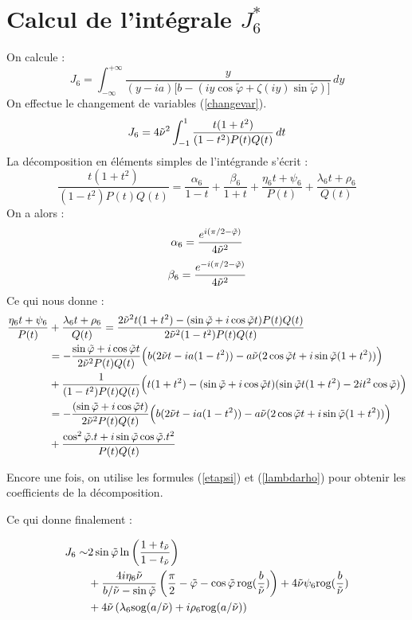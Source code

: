 \section{Calcul de l'intégrale $J_6^*$}
On calcule :
\begin{equation}
J_6=\int_{-\infty}^{+\infty} \frac{y}{(y-ia)\lbrack b-(iy\cos \tilde{\varphi}+ \zeta(iy)\sin \tilde{\varphi}) \rbrack}\,dy
\label{defJ6}
\end{equation}
On effectue le changement de variables (\ref{changevar}).
$$ J_6=4\tilde{\nu}^2\int_{-1}^{1}\frac{t(1+t^2)}{(1-t^2)P(t)Q(t)}\,dt $$
La décomposition en éléments simples de l'intégrande s'écrit :
$$\frac{t(1+t^2)}{(1-t^2)P(t)Q(t)}=\frac{\alpha_6}{1-t}+\frac{\beta_6}{1+t}+\frac{\eta_6 t+\psi_6}{P(t)}+\frac{\lambda_6 t +\rho_6}{Q(t)}$$
On a alors :
$$\alpha_6=\frac{e^{i(\pi/2-\tilde{\varphi})}}{4\tilde{\nu}^2}$$
$$\beta_6=\frac{e^{-i(\pi/2-\tilde{\varphi})}}{4\tilde{\nu}^2}$$
Ce qui nous donne :
\begin{equation*}
\begin{split}
\frac{\eta_6 t+\psi_6}{P(t)}&+\frac{\lambda_6 t +\rho_6}{Q(t)}=\frac{2\tilde{\nu}^2t(1+t^2)-(\sin\tilde{\varphi}+i\cos\tilde{\varphi} t)P(t)Q(t)}{2\tilde{\nu}^2(1-t^2)P(t)Q(t)}\\
&=-\frac{\sin\tilde{\varphi}+i\cos\tilde{\varphi} t}{2\tilde{\nu}^2P(t)Q(t)}\Big( b(2\tilde{\nu} t-ia(1-t^2))-a\tilde{\nu}(2\cos\tilde{\varphi} t+i\sin\tilde{\varphi}(1+t^2)) \Big) \\
&+\frac{1}{(1-t^2)P(t)Q(t)}\Big( t(1+t^2)-(\sin\tilde{\varphi}+i\cos\tilde{\varphi} t)(\sin\tilde{\varphi} t(1+t^2)-2it^2\cos\tilde{\varphi})\Big)\\
&=-\frac{(\sin\tilde{\varphi}+i\cos\tilde{\varphi} t)}{2\tilde{\nu}^2P(t)Q(t)}\Big( b(2\tilde{\nu} t-ia(1-t^2))-a\tilde{\nu}(2\cos\tilde{\varphi} t+i\sin\tilde{\varphi}(1+t^2)) \Big)\\
&+\frac{\cos^2\tilde{\varphi}.t+i\sin\tilde{\varphi}\cos\tilde{\varphi}.t^2}{P(t)Q(t)}
\end{split}
\end{equation*}

Encore une fois, on utilise les formules (\ref{etapsi}) et (\ref{lambdarho}) pour obtenir les coefficients de la décomposition.

Ce qui donne finalement :

\begin{equation}
\begin{split}
J_6\sim & 2\sin\tilde{\varphi}\ln\left(\frac{1+t_{\tilde{\nu}}}{1-t_{\tilde{\nu}}}\right)\\
&+\frac{4i\eta_6\tilde{\nu}}{b/\tilde{\nu}-\sin\tilde{\varphi}}\left(\frac{\pi}{2}-\tilde{\varphi}-\cos\tilde{\varphi} \,\mbox{rog}(\frac{b}{\tilde{\nu}}) \right)+4\tilde{\nu}\psi_6 \mbox{rog}(\frac{b}{\tilde{\nu}} )\\
&+4\tilde{\nu}\left(\lambda_6 \mbox{sog}(a/\tilde{\nu})+i\rho_6 \mbox{rog}(a/\tilde{\nu}) \right)
\end{split}
\label{valJ6}
\end{equation}

